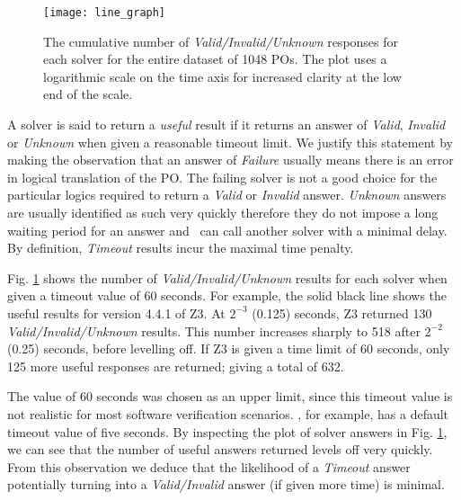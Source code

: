 \begin{figure}
	\centering
	\texttt{[image: line\_graph]}
	\caption[Cumulative number of useful responses for each solver over 60 seconds]{The cumulative number of \textit{Valid/Invalid/Unknown} responses for each solver for the entire dataset of 1048 POs. The plot uses a logarithmic scale on the time axis for increased clarity at the low end of the scale.}
	\label{fig:line_graph}
\end{figure}

\sloppypar
A solver is said to return a \textit{useful} result if it returns an answer of \textit{Valid}, \textit{Invalid} or \textit{Unknown} when given a reasonable timeout limit.
We justify this statement by making the observation that an answer of \textit{Failure} usually means there is an error in logical translation of the PO. 
The failing solver is not a good choice for the particular logics required to return a \textit{Valid} or \textit{Invalid} answer.
\textit{Unknown} answers are usually identified as such very quickly therefore they do not impose a long waiting period for an answer and \where~can call another solver with a minimal delay.
By definition, \textit{Timeout} results incur the maximal time penalty.  
    
Fig. \ref{fig:line_graph} shows the number of \textit{Valid/Invalid/Unknown} results for each solver when given a timeout value of 60 seconds. 
For example, the solid black line shows the useful results for version 4.4.1 of Z3.
At $2^{-3}$ (0.125) seconds, Z3 returned 130 \textit{Valid/Invalid/Unknown} results. 
This number increases sharply to 518 after $2^{-2}$ (0.25) seconds, before levelling off.
If Z3 is given a time limit of 60 seconds, only 125 more useful responses are returned; giving a total of 632.  

The value of 60 seconds was chosen as an upper limit, since this timeout value is not realistic for most software verification scenarios.  
\why, for example, has a default timeout value of five seconds.
By inspecting the plot of solver answers in Fig. \ref{fig:line_graph}, we can see that the number of useful answers returned levels off very quickly. 
From this observation we deduce that the likelihood of a \textit{Timeout} answer potentially turning into a \textit{Valid/Invalid} answer (if given more time) is minimal.  

